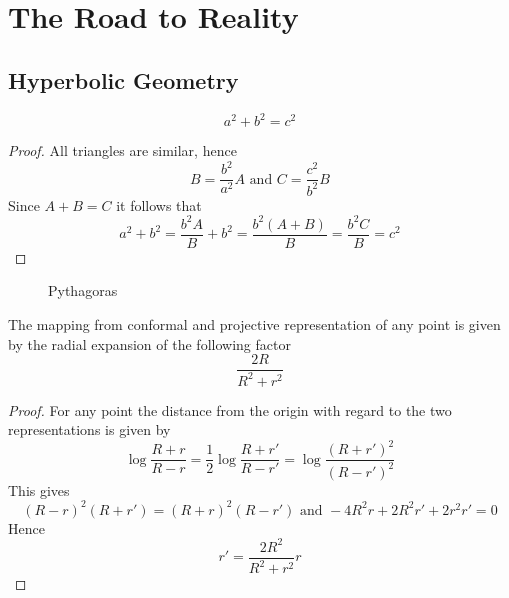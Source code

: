
\newpage
\section{The Road to Reality}


\subsection{Hyperbolic Geometry}

\begin{theorem}[Pythagoras]\label{thm:thm_pythagoras}
\[
    a^2 + b^2 = c^2
\]
\end{theorem}


\begin{proof}
All triangles are similar, hence
\[
    B = \frac{b^2}{a^2} A \text{ and }  C =  \frac{c^2}{b^2} B 
\]
Since \( A + B = C \) it follows that
\[
     a^2 + b^2 = \frac{b^2A}{B} + b^2 = \frac{b^2(A + B)}{B} = \frac{b^2 C}{B} = c^2
\]
\end{proof}
\bigskip

\begin{figure}[H]
\centering
{}
\caption{Pythagoras}\label{fig:pythagoras} 
\end{figure}
\bigskip


The mapping from conformal and projective representation of any point is given by the radial expansion 
of the following factor
\[
   \frac{2R}{R^2 + r^2}
\]  

\begin{proof}
For any point the distance from the origin with regard to the two representations is given by
\[
    \log \frac{R + r}{R - r} = \frac{1}{2} \log \frac{R + r'}{R - r'} = \log \frac{(R + r')^2}{(R - r')^2}
\]
This gives
\[
  {(R - r)}^2 (R + r') = {(R + r)}^2 (R - r') \text{ and } -4R^2r + 2R^2r' + 2r^2r' = 0
\] 
Hence
\[
   r' = \frac{2R^2}{R^2 + r^2} r
\] 
\end{proof}


